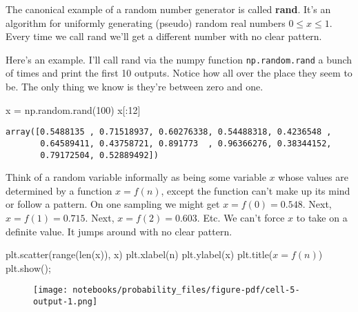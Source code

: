 \documentclass[
  letterpaper,
  DIV=11,
  numbers=noendperiod]{scrreprt}
\newenvironment{Shaded}{\begin{snugshade}}{\end{snugshade}}
\newcommand{\BuiltInTok}[1]{\textcolor[rgb]{0.00,0.23,0.31}{#1}}
\newcommand{\DecValTok}[1]{\textcolor[rgb]{0.68,0.00,0.00}{#1}}
\newcommand{\NormalTok}[1]{\textcolor[rgb]{0.00,0.23,0.31}{#1}}
\newcommand{\OperatorTok}[1]{\textcolor[rgb]{0.37,0.37,0.37}{#1}}
\newcommand{\StringTok}[1]{\textcolor[rgb]{0.13,0.47,0.30}{#1}}
\begin{document}
The canonical example of a random number generator is called
\textbf{rand}. It's an algorithm for uniformly generating (pseudo)
random real numbers \(0 \leq x \leq 1\). Every time we call rand we'll
get a different number with no clear pattern.

Here's an example. I'll call rand via the numpy function
\texttt{np.random.rand} a bunch of times and print the first 10 outputs.
Notice how all over the place they seem to be. The only thing we know is
they're between zero and one.

\begin{Shaded}
\begin{Highlighting}[]
\NormalTok{x }\OperatorTok{=}\NormalTok{ np.random.rand(}\DecValTok{100}\NormalTok{)}
\NormalTok{x[:}\DecValTok{12}\NormalTok{]}
\end{Highlighting}
\end{Shaded}

\begin{verbatim}
array([0.5488135 , 0.71518937, 0.60276338, 0.54488318, 0.4236548 ,
       0.64589411, 0.43758721, 0.891773  , 0.96366276, 0.38344152,
       0.79172504, 0.52889492])
\end{verbatim}

Think of a random variable informally as being some variable \(x\) whose
values are determined by a function \(x=f(n)\), except the function
can't make up its mind or follow a pattern. On one sampling we might get
\(x=f(0)=0.548\). Next, \(x=f(1)=0.715\). Next, \(x=f(2)=0.603\). Etc.
We can't force \(x\) to take on a definite value. It jumps around with
no clear pattern.

\begin{Shaded}
\begin{Highlighting}[]
\NormalTok{plt.scatter(}\BuiltInTok{range}\NormalTok{(}\BuiltInTok{len}\NormalTok{(x)), x)}
\NormalTok{plt.xlabel(}\StringTok{\textquotesingle{}n\textquotesingle{}}\NormalTok{)}
\NormalTok{plt.ylabel(}\StringTok{\textquotesingle{}x\textquotesingle{}}\NormalTok{)}
\NormalTok{plt.title(}\StringTok{\textquotesingle{}$x = f(n)$\textquotesingle{}}\NormalTok{)}
\NormalTok{plt.show()}\OperatorTok{;}
\end{Highlighting}
\end{Shaded}

\begin{figure}[H]

{\centering \texttt{[image: notebooks/probability\_files/figure-pdf/cell-5-output-1.png]}

}

\end{figure}
\end{document}
